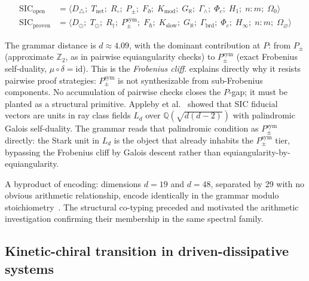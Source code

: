 \documentclass[12pt,a4paper]{article}
\newcommand{\Phic}{\Phi_c}
\newcommand{\Ppm}{P_{\pm}}
\newcommand{\Ppms}{P_{\pm}^{\text{sym}}}
\begin{document}
\begin{align}
  \text{SIC}_\text{open} &= \langle D_\triangle;\; T_\text{net};\; R_\circ;\;
    \Ppm;\; F_\eth;\; K_\text{mod};\; G_\aleph;\; \Gamma_\wedge;\;
    \Phic;\; H_1;\; n{:}m;\; \Omega_0 \rangle
    \label{eq:sic_open} \\[4pt]
  \text{SIC}_\text{proven} &= \langle D_\odot;\; T_\odot;\; R_\dagger;\;
    \Ppms;\; F_\hbar;\; K_\text{slow};\; G_\aleph;\; \Gamma_\text{brd};\;
    \Phic;\; H_\infty;\; n{:}m;\; \Omega_\varnothing \rangle
    \label{eq:sic_proven}
\end{align}

The grammar distance is $d \approx 4.09$, with the dominant contribution at
$P$: from $\Ppm$ (approximate $\mathbb{Z}_2$, as in pairwise equiangularity
checks) to $\Ppms$ (exact Frobenius self-duality, $\mu \circ \delta =
\text{id}$). This is the \emph{Frobenius cliff}. 
explains directly why it resists pairwise proof strategies: $\Ppms$ is
not synthesizable from sub-Frobenius components. No accumulation of
pairwise checks closes the $P$-gap; it must be planted as a structural
primitive. Appleby et al.\ \cite{afmy2017} showed that SIC fiducial
vectors are units in ray class fields $L_d$ over $\mathbb{Q}(\sqrt{d(d-2)})$
with palindromic Galois self-duality. The grammar reads that palindromic
condition as $\Ppms$ directly: the Stark unit in $L_d$ is the object
that already inhabits the $\Ppms$ tier, bypassing the Frobenius cliff
by Galois descent rather than equiangularity-by-equiangularity.

A byproduct of encoding: dimensions $d = 19$ and $d = 48$, separated
by 29 with no obvious arithmetic relationship, encode identically in the
grammar modulo stoichiometry~\cite{mills2026sic}. The structural
co-typing preceded and motivated the arithmetic investigation confirming
their membership in the same spectral family.

\subsection{Kinetic-chiral transition in driven-dissipative systems}
\end{document}
